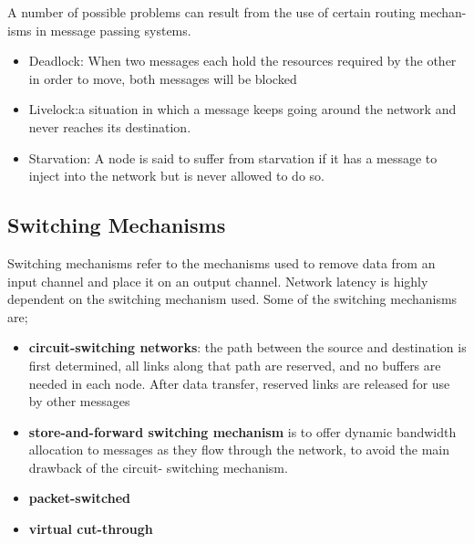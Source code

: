 \documentclass[11pt]{article}
\begin{document}
A number of possible problems can result from the use of certain routing mechan-
isms in message passing systems.

\begin{itemize}
\item{Deadlock: When two messages each hold the resources required by the other in
order to move, both messages will be blocked}
\item{Livelock:a situation in which a message keeps going around
the network and never reaches its destination.}

\item{Starvation: A node is said to suffer from starvation if it has a message to inject into the network but is never allowed to do so.}
\end{itemize}


\subsection{Switching Mechanisms}
Switching mechanisms refer to the mechanisms used to remove data from an input channel and place it on an output channel. Network latency is highly dependent on the switching mechanism used.
Some of the switching mechanisms are;
\begin{itemize}
\item{\textbf{circuit-switching networks}: the path between the source and destination is first determined, all links along that path are reserved, and no buffers are needed in each node. After data transfer, reserved links are released for use by other messages}
\item{\textbf{store-and-forward switching mechanism} is to offer dynamic bandwidth allocation to messages as they flow through the network, to avoid the main drawback of the circuit-
switching mechanism.}
\item{\textbf{packet-switched}}
\item{\textbf{virtual cut-through}}
\end{itemize}
\end{document}
